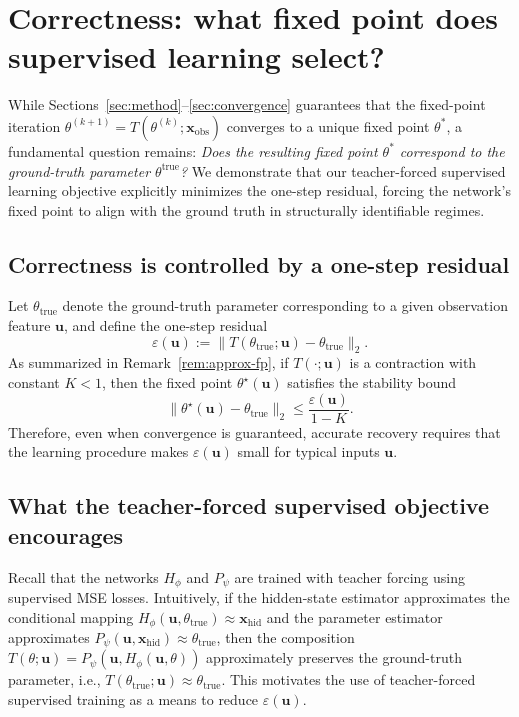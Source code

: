 
\section{Correctness: what fixed point does supervised learning select?}
\label{sec:correctness}

While Sections~\ref{sec:method}--\ref{sec:convergence} guarantees that the fixed-point iteration $\theta^{(k+1)} = T(\theta^{(k)};\mathbf{x}_\mathrm{obs})$ converges to a unique fixed point $\theta^*$, a fundamental question remains: 
\emph{Does the resulting fixed point $\theta^*$ correspond to the ground-truth parameter $\theta^\mathrm{true}$?}
We demonstrate that our teacher-forced supervised learning objective explicitly minimizes the one-step residual, forcing the network's fixed point to align with the ground truth in structurally identifiable regimes.

\subsection{Correctness is controlled by a one-step residual}
\label{subsec:correctness-residual}

Let $\theta_{\mathrm{true}}$ denote the ground-truth parameter corresponding to a given observation feature $\mathbf{u}$,
and define the one-step residual
\[
\varepsilon(\mathbf{u}) := \|T(\theta_{\mathrm{true}};\mathbf{u})-\theta_{\mathrm{true}}\|_2.
\]
As summarized in Remark~\ref{rem:approx-fp}, if $T(\cdot;\mathbf{u})$ is a contraction with constant $K<1$, then the fixed point $\theta^\star(\mathbf{u})$
satisfies the stability bound
\[
\|\theta^\star(\mathbf{u})-\theta_{\mathrm{true}}\|_2 \le \frac{\varepsilon(\mathbf{u})}{1-K}.
\]
Therefore, even when convergence is guaranteed, accurate recovery requires that the learning procedure makes $\varepsilon(\mathbf{u})$ small
for typical inputs $\mathbf{u}$.

\subsection{What the teacher-forced supervised objective encourages}
\label{subsec:correctness-supervised}

Recall that the networks $H_\phi$ and $P_\psi$ are trained with teacher forcing using supervised MSE losses.
Intuitively, if the hidden-state estimator approximates the conditional mapping
$H_\phi(\mathbf{u},\theta_{\mathrm{true}})\approx \mathbf{x}_{\mathrm{hid}}$
and the parameter estimator approximates
$P_\psi(\mathbf{u},\mathbf{x}_{\mathrm{hid}})\approx \theta_{\mathrm{true}}$,
then the composition $T(\theta;\mathbf{u}) = P_\psi(\mathbf{u},H_\phi(\mathbf{u},\theta))$ approximately preserves the ground-truth parameter,
i.e., $T(\theta_{\mathrm{true}};\mathbf{u})\approx\theta_{\mathrm{true}}$.
This motivates the use of teacher-forced supervised training as a means to reduce $\varepsilon(\mathbf{u})$.

